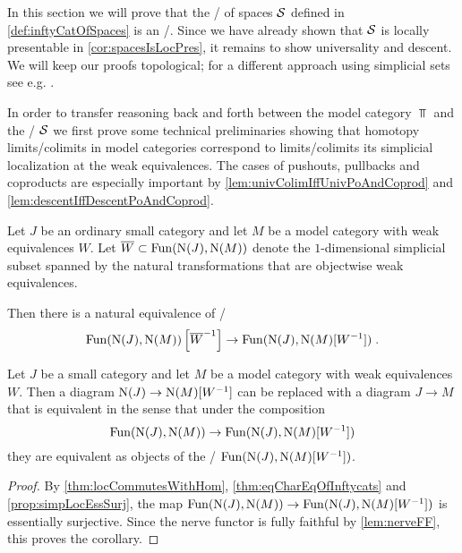 In this section we will prove that the \inftycat/ of spaces $\mathcal{S}$ defined in \cref{def:inftyCatOfSpaces} is an \inftytop/.
Since we have already shown that $\mathcal{S}$ is locally presentable in \cref{cor:spacesIsLocPres}, it remains to show universality and descent.
We will keep our proofs topological; for a different approach using simplicial sets see e.g. \cite[\S 6]{HTT}.

In order to transfer reasoning back and forth between the model category $\Top$ and the \inftycat/ $\mathcal{S}$ we first prove some technical preliminaries showing that homotopy limits/colimits in model categories correspond to limits/colimits its simplicial localization at the weak equivalences.
The cases of pushouts, pullbacks and coproducts are especially important by \cref{lem:univColimIffUnivPoAndCoprod} and \cref{lem:descentIffDescentPoAndCoprod}.
\begin{thm}\label{thm:locCommutesWithHom} 
    Let $J$ be an ordinary small category and let $M$ be a model category with weak equivalences $W$.
    Let $\overline{W}\subset\operatorname{Fun}(\operatorname{N}(J),\operatorname{N}(M))$ denote the $1$-dimensional simplicial subset spanned by the natural transformations that are objectwise weak equivalences.
    
    Then there is a natural equivalence of \inftycats/
    \begin{equation*}
        \operatorname{Fun}(\operatorname{N}(J),\operatorname{N}(M))\left[\overline{W}^{-1}\right]\to\operatorname{Fun}(\operatorname{N}(J),\operatorname{N}(M)[W^{-1}])\;.
    \end{equation*} 
    \begin{reference}
        \cite[Remark 7.9.7 and Theorem 7.9.8]{cisinski_2019}
    \end{reference}
\end{thm}
\begin{corollary}\label{cor:replaceWithStrictDiagram}
    Let $J$ be a small category and let $M$ be a model category with weak equivalences $W$.
    Then a diagram $\operatorname{N}(J)\to\operatorname{N}(M)[W^{-1}]$ can be replaced with a diagram $J\to M$ that is equivalent in the sense that under the composition
    \begin{equation*}
        \operatorname{Fun}(\operatorname{N}(J),\operatorname{N}(M))\to\operatorname{Fun}(\operatorname{N}(J),\operatorname{N}(M)[W^{-1}])
    \end{equation*} 
    they are equivalent as objects of the \inftycat/ $\operatorname{Fun}(\operatorname{N}(J),\operatorname{N}(M)[W^{-1}])$.
    \begin{proof}
        By \cref{thm:locCommutesWithHom}, \cref{thm:eqCharEqOfInftycats} and \cref{prop:simpLocEssSurj}, the map $\operatorname{Fun}(\operatorname{N}(J),\operatorname{N}(M))\to\operatorname{Fun}(\operatorname{N}(J),\operatorname{N}(M)[W^{-1}])$ is essentially surjective.
        Since the nerve functor is fully faithful by \cref{lem:nerveFF}, this proves the corollary.
    \end{proof}
\end{corollary}
